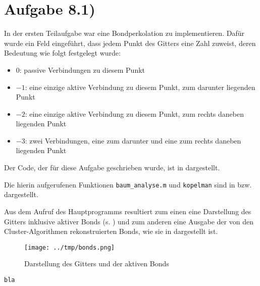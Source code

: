 \section*{Aufgabe 8.1)}
In der ersten Teilaufgabe war eine Bondperkolation zu implementieren. Dafür wurde
ein Feld eingeführt, dass jedem Punkt des Gitters eine Zahl zuweist, deren Bedeutung
wie folgt festgelegt wurde:
\begin{itemize}
\item $0$: passive Verbindungen zu diesem Punkt
\item $-1$: eine einzige aktive Verbindung zu diesem Punkt, zum darunter liegenden Punkt
\item $-2$: eine einzige aktive Verbindung zu diesem Punkt, zum rechts daneben liegenden Punkt
\item $-3$: zwei Verbindungen, eine zum darunter und eine zum rechts daneben liegenden Punkt
\end{itemize}

Der Code, der für diese Aufgabe geschrieben wurde, ist in  dargestellt.



Die hierin aufgerufenen Funktionen \texttt{baum\_analyse.m} und \texttt{kopelman} sind in  bzw.  dargestellt.




Aus dem Aufruf des Hauptprogramms resultiert zum einen eine Darstellung des Gitters
inklusive aktiver Bonds (s. ) und zum anderen eine Ausgabe der von den
Cluster-Algorithmen rekonstruierten Bonds, wie sie in  dargestellt ist.

\begin{figure}[htb]
  \centering
  \texttt{[image: ../tmp/bonds.png]}
  \caption{Darstellung des Gitters und der aktiven Bonds}
  \label{fig:bonds}
\end{figure}

\begin{lstlisting}[caption=Ausgabe von \lref{bond_perk},label=lst:output]
bla
\end{lstlisting}